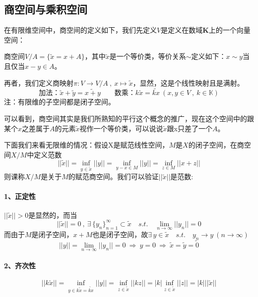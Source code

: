 \subsection{商空间与乘积空间}
在有限维空间中，商空间的定义如下，我们先定义$V$是定义在数域$\mathbf{K}$上的一个向量空间：
\begin{definition}[商空间]
    商空间$V/A=\{\tilde{x}=x+A\}$，其中$\tilde{x}$是一个等价类，等价关系$\sim$定义如下：$x \sim y$当且仅当$x-y \in A$。
\end{definition}
再者，我们定义商映射$\pi:V \to V/A \ , \ x \mapsto \tilde{x}$，显然，这是个线性映射且是满射。
\[\text{加法：}\tilde{x}+\tilde{y}=\tilde{x+y} \qquad \text{数乘：}k\tilde{x}=\tilde{kx} \ (x,y \in V \ , \ k \in \mathbb{K})\]
注：有限维的子空间都是闭子空间。

可以看到，商空间其实是我们所熟知的平行这个概念的推广，现在这个空间中的跟某个$x$之差属于$A$的元素$\tilde{x}$视作一个等价类，可以说说$\tilde{x}$跟x只差了一个$A$。

下面我们来看无限维的情况：假设X是赋范线性空间，$M$是$X$的闭子空间，在商空间$X/M$中定义范数
\[||\tilde{x}||=\mathop \text{inf}\limits_{y \in \tilde{x}}||y||=\mathop \text{inf}\limits_{y-x \in M}||y||=\mathop \text{inf}\limits_{z \in M}||x+z||\]
则课称$X/M$是关于$M$的赋范商空间。我们可以验证$||\tilde{x}||$是范数:
\paragraph*{1、正定性} \quad $||\tilde{x}||>0$是显然的，而当
\[||\tilde{x}||=0 \ , \ \exists \, \{y_n\}_{n=1}^{\infty} \subset \tilde{x} \quad s.t. \quad \lim_{n \to \infty}||y_n||=0\]
而由于$M$是闭子空间，$x+M$也是闭子空间，故$\exists \, y \in \tilde{x} \quad s.t. \quad y_n \to y \ (n \to \infty)$
\[||y||=\lim_{n \to \infty}||y_n||=0 \ \Rightarrow \ y=0 \ \Rightarrow \ \tilde{x}=\tilde{y}=\tilde{0}\]
\paragraph*{2、齐次性}
\[||k\tilde{x}||=\mathop \text{inf}\limits_{y \in k\tilde{x}=\tilde{kx}}||y||=\mathop \text{inf}\limits_{z \in \tilde{x}}||kz||=|k|\mathop \text{inf}\limits_{z \in \tilde{x}}||z||=|k|||\tilde{x}||\] 
